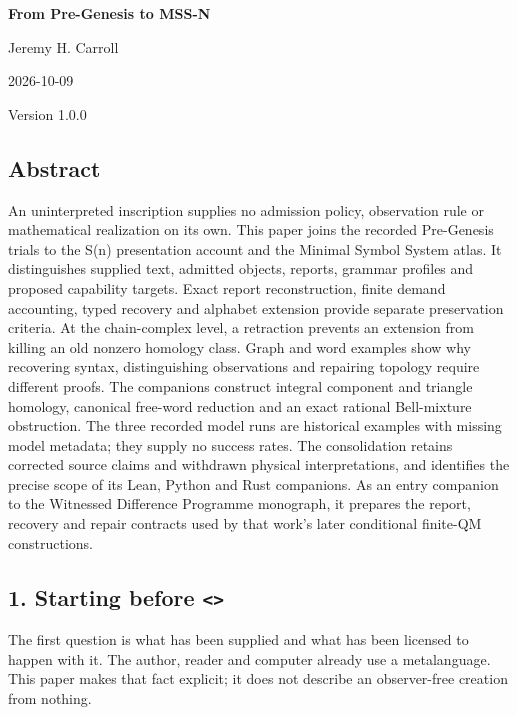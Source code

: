 \documentclass[
  11pt,
]{article}
\author{}
\date{}
\begin{document}
\begin{center}
{\LARGE\bfseries From Pre-Genesis to MSS-N\par}
Jeremy H. Carroll\par
2026-10-09\par
Version 1.0.0\par
\end{center}

\subsection{Abstract}\label{abstract}

An uninterpreted inscription supplies no admission policy, observation
rule or mathematical realization on its own. This paper joins the
recorded Pre-Genesis trials to the S(n) presentation account and the
Minimal Symbol System atlas. It distinguishes supplied text, admitted
objects, reports, grammar profiles and proposed capability targets.
Exact report reconstruction, finite demand accounting, typed recovery
and alphabet extension provide separate preservation criteria. At the
chain-complex level, a retraction prevents an extension from killing an
old nonzero homology class. Graph and word examples show why recovering
syntax, distinguishing observations and repairing topology require
different proofs. The companions construct integral component and
triangle homology, canonical free-word reduction and an exact rational
Bell-mixture obstruction. The three recorded model runs are historical
examples with missing model metadata; they supply no success rates. The
consolidation retains corrected source claims and withdrawn physical
interpretations, and identifies the precise scope of its Lean, Python
and Rust companions. As an entry companion to the Witnessed Difference
Programme monograph, it prepares the report, recovery and repair
contracts used by that work's later conditional finite-QM constructions.

\subsection{\texorpdfstring{1. Starting before
\texttt{\textless{}\textgreater{}}}{1. Starting before \textless\textgreater{}}}\label{starting-before}

The first question is what has been supplied and what has been licensed
to happen with it. The author, reader and computer already use a
metalanguage. This paper makes that fact explicit; it does not describe
an observer-free creation from nothing.
\end{document}
